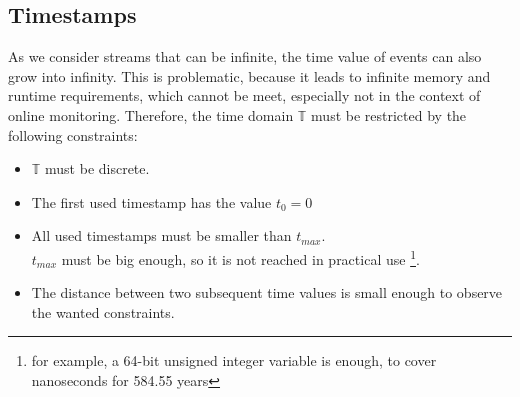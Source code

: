 	\subsection{Timestamps}
		\label{monitorability_timestamps}
		As we consider streams that can be infinite, the time value of events can also grow into infinity. This is problematic, because it leads to infinite memory and runtime requirements, which cannot be meet, especially not in the context of online monitoring. Therefore, the time domain $\mathbb{T}$ must be restricted by the following constraints:
		\begin{itemize}
			\item
				$\mathbb{T}$ must be discrete.
			\item
				The first used timestamp has the value $t_0=0$
			\item
				All used timestamps must be smaller than $t_{max}$.\\
				$t_{max}$ must be big enough, so it is not reached in practical use \footnote{for example, a 64-bit unsigned integer variable is enough, to cover nanoseconds for 584.55 years}.
			\item
				The distance between two subsequent time values is small enough to observe the wanted constraints.
		\end{itemize}
